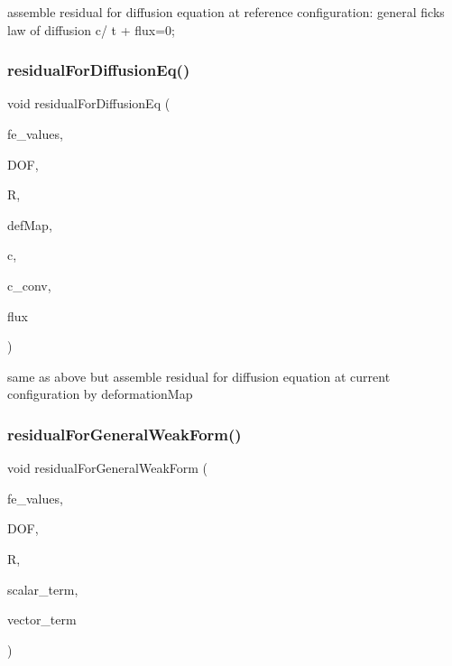 assemble residual for diffusion equation at reference configuration\+: general fick\textquotesingle{}s law of diffusion  c/ t +  flux=0; \mbox{\label{class_residual_a69b8ab1cc85ae177f9c627b60b1b8468}} 
\subsubsection{\texorpdfstring{residual\+For\+Diffusion\+Eq()}{residualForDiffusionEq()}\hspace{0.1cm}{\footnotesize\ttfamily [2/2]}}
{\footnotesize\ttfamily void residual\+For\+Diffusion\+Eq (\begin{DoxyParamCaption}\item[{const F\+E\+Values$<$ dim $>$ \&}]{fe\+\_\+values,  }\item[{unsigned int}]{D\+OF,  }\item[{dealii\+::\+Table$<$ 1, T $>$ \&}]{R,  }\item[{\mbox{\hyperlink{structdeformation_map}{deformation\+Map}}$<$ T, dim $>$ \&}]{def\+Map,  }\item[{dealii\+::\+Table$<$ 1, T $>$ \&}]{c,  }\item[{dealii\+::\+Table$<$ 1, double $>$ \&}]{c\+\_\+conv,  }\item[{dealii\+::\+Table$<$ 2, T $>$ \&}]{flux }\end{DoxyParamCaption})}

same as above but assemble residual for diffusion equation at current configuration by deformation\+Map \mbox{\label{class_residual_ab90bb5476a96c0e7098264562b313b7b}} 
\subsubsection{\texorpdfstring{residual\+For\+General\+Weak\+Form()}{residualForGeneralWeakForm()}\hspace{0.1cm}{\footnotesize\ttfamily [1/2]}}
{\footnotesize\ttfamily void residual\+For\+General\+Weak\+Form (\begin{DoxyParamCaption}\item[{const F\+E\+Values$<$ dim $>$ \&}]{fe\+\_\+values,  }\item[{unsigned int}]{D\+OF,  }\item[{dealii\+::\+Table$<$ 1, T $>$ \&}]{R,  }\item[{dealii\+::\+Table$<$ 1, T $>$ \&}]{scalar\+\_\+term,  }\item[{dealii\+::\+Table$<$ 2, T $>$ \&}]{vector\+\_\+term }\end{DoxyParamCaption})}

